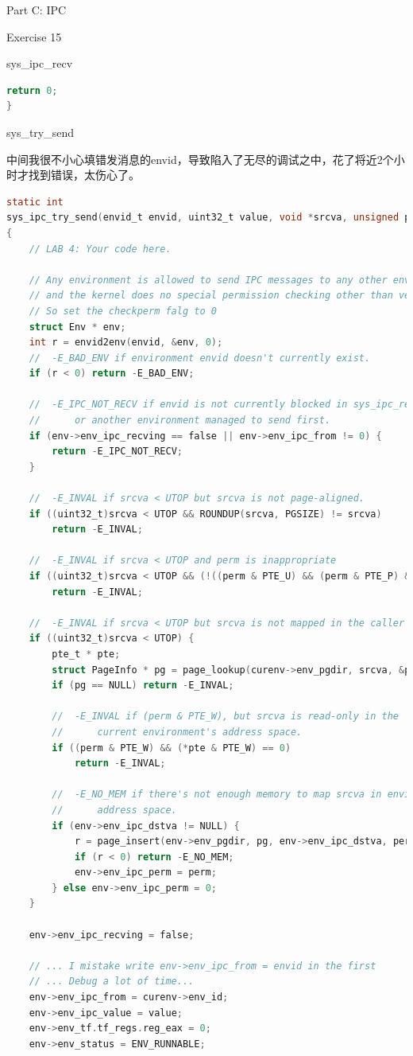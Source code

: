 \documentclass[GBK,winfonts,a4paper,10pt]{ctexart}
\begin{document}
\begin{section}{ Part C: IPC }
\begin{subsection}{ Exercise 15 }
\begin{subsection}{ sys\_ipc\_recv }
\begin{lstlisting}[language = C]
	return 0;
}
\end{lstlisting}
\end{subsection}

\begin{subsection}{ sys\_try\_send }
\par
中间我很不小心填错发消息的envid，导致陷入了无尽的调试之中，花了将近2个小时才找到错误，太伤心了。
\begin{lstlisting}[language = C]
static int
sys_ipc_try_send(envid_t envid, uint32_t value, void *srcva, unsigned perm)
{
	// LAB 4: Your code here.
	
	// Any environment is allowed to send IPC messages to any other environment, 
	// and the kernel does no special permission checking other than verifying that the target envid is valid.
	// So set the checkperm falg to 0
	struct Env * env;
	int r = envid2env(envid, &env, 0);	
	//	-E_BAD_ENV if environment envid doesn't currently exist.
	if (r < 0) return -E_BAD_ENV;

	//	-E_IPC_NOT_RECV if envid is not currently blocked in sys_ipc_recv,
	//		or another environment managed to send first.
	if (env->env_ipc_recving == false || env->env_ipc_from != 0) {
		return -E_IPC_NOT_RECV;
	}

	//	-E_INVAL if srcva < UTOP but srcva is not page-aligned.
	if ((uint32_t)srcva < UTOP && ROUNDUP(srcva, PGSIZE) != srcva)
		return -E_INVAL;

	//	-E_INVAL if srcva < UTOP and perm is inappropriate
	if ((uint32_t)srcva < UTOP && (!((perm & PTE_U) && (perm & PTE_P) && (perm & (~PTE_SYSCALL))==0))) 
		return -E_INVAL;

	//	-E_INVAL if srcva < UTOP but srcva is not mapped in the caller's address space 
	if ((uint32_t)srcva < UTOP) {
		pte_t * pte;
		struct PageInfo * pg = page_lookup(curenv->env_pgdir, srcva, &pte);
		if (pg == NULL) return -E_INVAL;

		//	-E_INVAL if (perm & PTE_W), but srcva is read-only in the
		//		current environment's address space.
		if ((perm & PTE_W) && (*pte & PTE_W) == 0) 
			return -E_INVAL;

		//	-E_NO_MEM if there's not enough memory to map srcva in envid's
		//		address space.
		if (env->env_ipc_dstva != NULL) {
			r = page_insert(env->env_pgdir, pg, env->env_ipc_dstva, perm);
			if (r < 0) return -E_NO_MEM;
			env->env_ipc_perm = perm;
		} else env->env_ipc_perm = 0;	
	}

	env->env_ipc_recving = false;

	// ... I mistake write env->env_ipc_from = envid in the first
	// ... Debug a lot of time...
	env->env_ipc_from = curenv->env_id;
	env->env_ipc_value = value;
	env->env_tf.tf_regs.reg_eax = 0;
	env->env_status = ENV_RUNNABLE;


\end{lstlisting}
\end{subsection}
\end{subsection}
\end{section}
\end{document}
